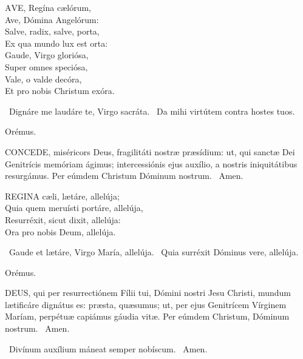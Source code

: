 


\lettrine[lines=2]{A}{VE}, Regína cælórum,\\
Ave, Dómina Angelórum:\\
Salve, radix, salve, porta,\\
Ex qua mundo lux est orta:\\
Gaude, Virgo gloriósa,\\
Super omnes speciósa,\\
Vale, o valde decóra,\\
Et pro nobis Christum exóra.

\V\ Dignáre me laudáre te, Virgo sacráta. \R\ Da mihi virtútem contra hostes tuos.

Orémus. 

\lettrine[lines=2]{C}{ONCEDE}, miséricors Deus, fragilitáti nostræ præsídium: ut, qui sanctæ Dei Genitrícis memóriam ágimus; intercessiónis ejus auxílio, a nostris iniquitátibus resurgámus. Per eúmdem Christum Dóminum nostrum. \R\ Amen.



\lettrine[lines=2]{R}{EGINA} cæli, lætáre, allelúja;\\
Quia quem meruísti portáre, allelúja,\\
Resurréxit, sicut dixit, allelúja:\\
Ora pro nobis Deum, allelúja.

\V\ Gaude et lætáre, Virgo María, allelúja. \R\ Quia surréxit Dóminus vere, allelúja.

Orémus. 

\lettrine[lines=2]{D}{EUS}, qui per resurrectiónem Fílii tui, Dómini nostri Jesu Christi, mundum lætificáre dignátus es: præsta, quæsumus; ut, per ejus Genitrícem Vírginem Maríam, perpétuæ capiámus gáudia vitæ. Per eúmdem Christum, Dóminum nostrum. \R\ Amen.


\V\ Divínum auxílium máneat semper nobíscum. \R\ Amen.

